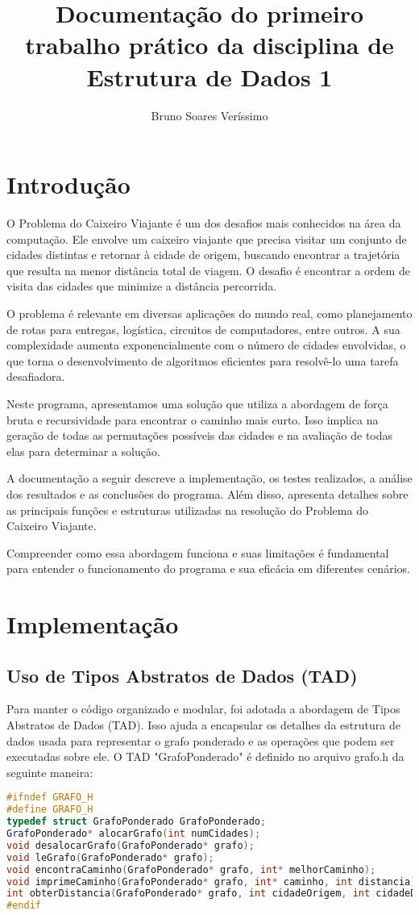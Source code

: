 \documentclass[12pt]{spieman}
\title{Documentação do primeiro trabalho prático da disciplina de Estrutura de Dados 1}
\author{Bruno Soares Veríssimo}
\affil{Universidade Federal de Ouro Preto - UFOP}
\begin{document}
 
\maketitle

\section{Introdução}
\label{sect:intro}  

O Problema do Caixeiro Viajante é um dos desafios mais conhecidos na área da computação. Ele envolve um caixeiro viajante que precisa visitar um conjunto de cidades distintas e retornar à cidade de origem, buscando encontrar a trajetória que resulta na menor distância total de viagem. O desafio é encontrar a ordem de visita das cidades que minimize a distância percorrida.

O problema é relevante em diversas aplicações do mundo real, como planejamento de rotas para entregas, logística, circuitos de computadores, entre outros. A sua complexidade aumenta exponencialmente com o número de cidades envolvidas, o que torna o desenvolvimento de algoritmos eficientes para resolvê-lo uma tarefa desafiadora.

Neste programa, apresentamos uma solução que utiliza a abordagem de força bruta e recursividade para encontrar o caminho mais curto. Isso implica na geração de todas as permutações possíveis das cidades e na avaliação de todas elas para determinar a solução.

A documentação a seguir descreve a implementação, os testes realizados, a análise dos resultados e as conclusões do programa. Além disso, apresenta detalhes sobre as principais funções e estruturas utilizadas na resolução do Problema do Caixeiro Viajante.

Compreender como essa abordagem funciona e suas limitações é fundamental para entender o funcionamento do programa e sua eficácia em diferentes cenários.


\section{Implementação}

\subsection{Uso de Tipos Abstratos de Dados (TAD)}
Para manter o código organizado e modular, foi adotada a abordagem de Tipos Abstratos de Dados (TAD). Isso ajuda a encapsular os detalhes da estrutura de dados usada para representar o grafo ponderado e as operações que podem ser executadas sobre ele. O TAD "GrafoPonderado" é definido no arquivo grafo.h da seguinte maneira:
\begin{lstlisting}[language=C]
#ifndef GRAFO_H
#define GRAFO_H
typedef struct GrafoPonderado GrafoPonderado;
GrafoPonderado* alocarGrafo(int numCidades);
void desalocarGrafo(GrafoPonderado* grafo);
void leGrafo(GrafoPonderado* grafo);
void encontraCaminho(GrafoPonderado* grafo, int* melhorCaminho);
void imprimeCaminho(GrafoPonderado* grafo, int* caminho, int distancia);
int obterDistancia(GrafoPonderado* grafo, int cidadeOrigem, int cidadeDestino);
#endif
\end{lstlisting}
\end{document}

